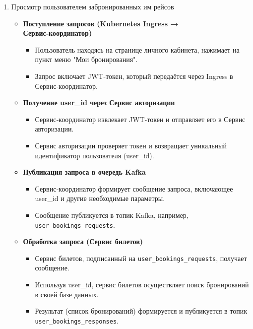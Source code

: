 \begin{enumerate}
\begin{itemize}
    \end{itemize}

    \item Просмотр пользователем забронированных им рейсов
    \begin{itemize}
        \item \textbf{Поступление запросов (Kubernetes Ingress → Сервис‑координатор)}
        \begin{itemize}
            \item Пользователь находясь на странице личного кабинета, нажимает на пункт меню "Мои бронирования".
            \item Запрос включает JWT-токен, который передаётся через Ingress в Сервис‑координатор.
        \end{itemize}

        \item \textbf{Получение user\_id через Сервис авторизации}
        \begin{itemize}
            \item Сервис‑координатор извлекает JWT-токен и отправляет его в Сервис авторизации.
            \item Сервис авторизации проверяет токен и возвращает уникальный идентификатор пользователя (user\_id).
        \end{itemize}

        \item \textbf{Публикация запроса в очередь Kafka}
        \begin{itemize}
            \item Сервис‑координатор формирует сообщение запроса, включающее user\_id и другие необходимые параметры.
            \item Сообщение публикуется в топик Kafka, например, \texttt{user\_bookings\_requests}.
        \end{itemize}

        \item \textbf{Обработка запроса (Сервис билетов)}
        \begin{itemize}
            \item Сервис билетов, подписанный на \texttt{user\_bookings\_requests}, получает сообщение.
            \item Используя user\_id, сервис билетов осуществляет поиск бронирований в своей базе данных.
            \item Результат (список бронирований) формируется и публикуется в топик \texttt{user\_bookings\_responses}.
        \end{itemize}


\end{itemize}
\end{enumerate}
